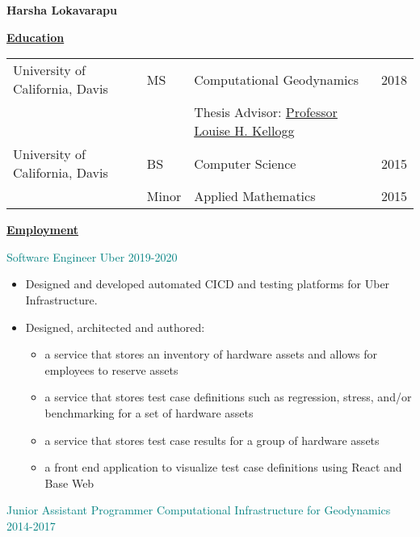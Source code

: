 \documentclass[11pt]{ltxdoc}
\begin{document}
\begin{center}
  \textbf{Harsha Lokavarapu}
\end{center}
\vskip -10pt

\textbf{\underline{Education}}

\vskip -06pt

\begin{tabular}{llll}
University of California, Davis              &MS       &Computational Geodynamics      & 2018 \\
                                             &       &Thesis Advisor: \href{http://geology.ucdavis.edu/people/faculty/kellogg.php}{Professor Louise H. Kellogg}        &  \\
University of California, Davis              &BS      & Computer Science                         & 2015       \\
                                             &Minor   & Applied Mathematics                      & 2015
\end{tabular}


\vskip -10pt
\textbf{\underline{Employment}}

		{\textcolor{teal}{Software Engineer} \hfill \textcolor{teal}{Uber} \hfill \textcolor{teal}{2019-2020}}
		\begin{itemize}
 			\item Designed and developed automated CICD and testing platforms for Uber Infrastructure.
	 		\item Designed, architected and authored:
		 	\begin{itemize}
		 	  \item a service that stores an inventory of hardware assets and allows for employees to reserve assets
		 	  \item a service that stores test case definitions such as regression, stress, and/or benchmarking for a set of hardware assets
		 	  \item a service that stores test case results for a group of hardware assets
		 	  \item a front end application to visualize test case definitions using React and Base Web
		 	\end{itemize}
	 	\end{itemize}

	{\textcolor{teal}{Junior Assistant Programmer} \hfill \textcolor{teal}{Computational Infrastructure for Geodynamics} \hfill \textcolor{teal}{2014-2017}}
\end{document}
